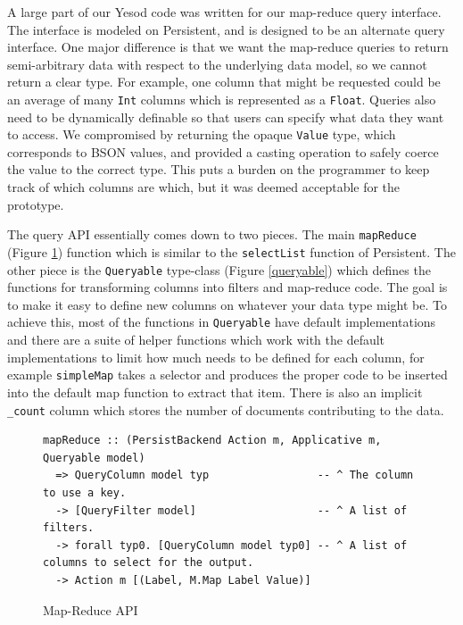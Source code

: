 \documentclass{chi2009}
\newcommand{\code}[1]{\texttt{#1}}
\begin{document}
A large part of our Yesod code was written for our map-reduce query interface.  The interface is modeled on Persistent, and is designed to be an alternate query interface.  One major difference is that we want the map-reduce queries to return semi-arbitrary data with respect to the underlying data model, so we cannot return a clear type.  For example, one column that might be requested could be an average of many \code{Int} columns which is represented as a \code{Float}.  Queries also need to be dynamically definable so that users can specify what data they want to access.  We compromised by returning the opaque \code{Value} type, which corresponds to BSON values, and provided a casting operation to safely coerce the value to the correct type.  This puts a burden on the programmer to keep track of which columns are which, but it was deemed acceptable for the prototype.

The query API essentially comes down to two pieces.  The main \code{mapReduce} (Figure \ref{mrapi}) function which is similar to the \code{selectList} function of Persistent.  The other piece is the \code{Queryable} type-class (Figure \ref{queryable}) which defines the functions for transforming columns into filters and map-reduce code.  The goal is to make it easy to define new columns on whatever your data type might be.  To achieve this, most of the functions in \code{Queryable} have default implementations and there are a suite of helper functions which work with the default implementations to limit how much needs to be defined for each column, for example \code{simpleMap} takes a selector and produces the proper code to be inserted into the default map function to extract that item.  There is also an implicit \code{\_count} column which stores the number of documents contributing to the data.

\begin{figure}[t]
\begin{verbatim}
mapReduce :: (PersistBackend Action m, Applicative m, Queryable model)
  => QueryColumn model typ                 -- ^ The column to use a key.
  -> [QueryFilter model]                   -- ^ A list of filters.
  -> forall typ0. [QueryColumn model typ0] -- ^ A list of columns to select for the output.
  -> Action m [(Label, M.Map Label Value)]
\end{verbatim}
    \caption{Map-Reduce API}
    \label{mrapi}
\end{figure}
\end{document}
